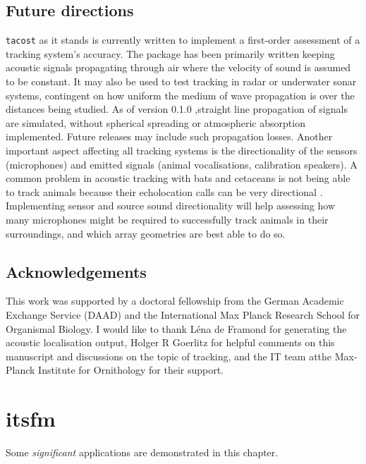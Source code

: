 \documentclass[
]{book}
\begin{document}
\hypertarget{future-directions}{%
\section{Future directions}\label{future-directions}}

\texttt{tacost} as it stands is currently written to implement a first-order assessment of a tracking system's accuracy. The package has been primarily written keeping acoustic signals propagating through air where the velocity of sound is assumed to be constant. It may also be used to test tracking in radar or underwater sonar systems, contingent on how uniform the medium of wave propagation is over the distances being studied. As of version 0.1.0
,straight line propagation of signals are simulated, without spherical spreading or atmospheric absorption implemented. Future releases may include such propagation losses. Another important aspect affecting all tracking systems is the directionality of the sensors (microphones) and emitted signals (animal vocalisations, calibration speakers). A common problem in acoustic tracking with bats and cetaceans is not being able to track animals because their echolocation calls can be very directional \citep{Matsuta2013, Surlykke2012, Koblitz2016}. Implementing sensor and source sound directionality will help assessing how many microphones might be required to successfully track animals in their surroundings, and which array geometries are best able to do so.

\hypertarget{acknowledgements}{%
\section{Acknowledgements}\label{acknowledgements}}

This work was supported by a doctoral fellowship from the German Academic Exchange Service (DAAD) and the International Max Planck Research School for Organismal Biology.
I would like to thank Léna de Framond for generating the acoustic localisation output, Holger R Goerlitz for helpful comments on this manuscript and discussions on the topic of tracking, and the IT team atthe Max-Planck Institute for Ornithology for their support.

\hypertarget{itsfm}{%
\chapter{itsfm}\label{itsfm}}

Some \emph{significant} applications are demonstrated in this chapter.
\end{document}
